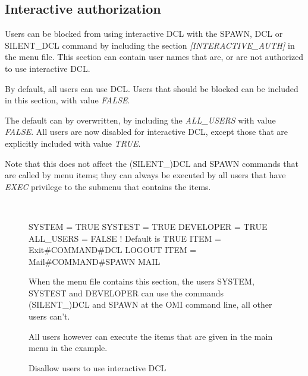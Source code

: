 \documentclass[a4paper]{book}
\newcommand{\vs}{\vspace{3mm}}
\renewcommand{\indent}{\hspace*{5mm}}
\begin{document}
\subsection{Interactive authorization}
\index{{\$}}
\label{subsubsec:interactive}

Users can be blocked from using interactive DCL with the \textsf{SPAWN}, \textsf{DCL} or  
\textsf{SILENT{\_}DCL} command by including the section \textsl{[INTERACTIVE{\_}AUTH]} in 
the menu file. This section can contain user names that are, or are not 
authorized to use interactive DCL.

\vs

By default, all users can use DCL. Users that should be blocked can be 
included in this section, with value \textsl{FALSE}.

The default can by overwritten, by including the \textsl{ALL{\_}USERS} with value 
\textsl{FALSE}. All users are now disabled for interactive DCL, except those that are 
explicitly included with value \textsl{TRUE}.

\vs

Note that this does not affect the \textsf{(SILENT{\_})DCL} and \textsf{SPAWN} commands that 
are called by menu items; they can always be executed by all users that have 
\textsl{EXEC} privilege to the submenu that contains the items.

\begin{figure}[h!tb]
\begin{minipage}[h!tb]{\textwidth}
\hrulefill \\
\begin{ttfamily}
 \newline
\indent SYSTEM = TRUE \newline
\indent SYSTEST = TRUE \newline
\indent DEVELOPER = TRUE \newline
\indent ALL{\_}USERS = FALSE ! Default is TRUE \newline
 \newline
{} \newline
\indent ITEM = Exit{\#}COMMAND{\#}DCL LOGOUT \newline
\indent ITEM = Mail{\#}COMMAND{\#}SPAWN MAIL \newline
\end{ttfamily}

\noindent When the menu file contains this section, the users SYSTEM, SYSTEST and 
DEVELOPER can use the commands \textsf{(SILENT{\_})DCL} and \textsf{SPAWN} at the OMI command 
line, all other users can't.

All users however can execute the items that are given in the main menu in 
the example. 
\caption{Disallow users to use interactive DCL}\label{fig:disallowdcl}
\hrulefill
\end{minipage}
\end{figure}
\end{document}
